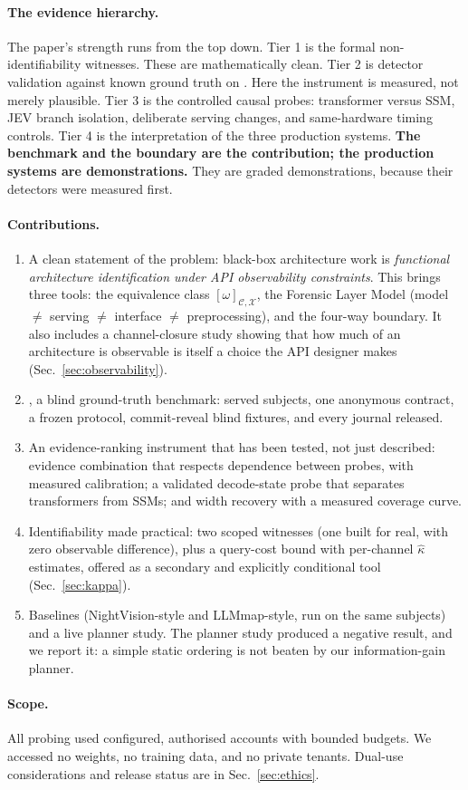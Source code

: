 \paragraph{The evidence hierarchy.}  The paper's strength runs from the top down.
Tier 1 is the formal non-identifiability witnesses.  These are mathematically clean.
Tier 2 is detector validation against known ground truth on \benchname{}.  Here the
instrument is measured, not merely plausible.  Tier 3 is the controlled causal probes:
transformer versus SSM, JEV branch isolation, deliberate serving changes, and
same-hardware timing controls.  Tier 4 is the interpretation of the three production
systems.  \textbf{The benchmark and the boundary are the contribution; the production
systems are demonstrations.}  They are graded demonstrations, because their detectors
were measured first.

\paragraph{Contributions.}
\begin{enumerate}[label=\textbf{C\arabic*.},leftmargin=2.6em]
\item A clean statement of the problem: black-box architecture work is \emph{functional
  architecture identification under API observability constraints}.  This brings
  three tools: the equivalence class $[\omega]_{\mathcal C,\mathcal X}$, the Forensic
  Layer Model (model $\neq$ serving $\neq$ interface $\neq$ preprocessing), and the
  four-way boundary.  It also includes a channel-closure study showing that how much of
  an architecture is observable is itself a choice the API designer makes
  (Sec.~\ref{sec:observability}).
\item \benchname{}, a blind ground-truth benchmark: \BenchN{} served subjects, one
  anonymous contract, a frozen protocol, commit-reveal blind fixtures, and every journal
  released.
\item An evidence-ranking instrument that has been tested, not just described: evidence
  combination that respects dependence between probes, with measured calibration; a
  validated decode-state probe that separates transformers from SSMs; and width recovery
  with a measured coverage curve.
\item Identifiability made practical: two scoped witnesses (one built for real, with zero
  observable difference), plus a query-cost bound with per-channel $\hat\kappa$
  estimates, offered as a secondary and explicitly conditional tool
  (Sec.~\ref{sec:kappa}).
\item Baselines (NightVision-style and LLMmap-style, run on the same subjects) and a live
  planner study.  The planner study produced a negative result, and we report it: a
  simple static ordering is not beaten by our information-gain planner.
\end{enumerate}

\paragraph{Scope.} All probing used configured, authorised accounts with bounded
budgets.  We accessed no weights, no training data, and no private tenants.  Dual-use
considerations and release status are in Sec.~\ref{sec:ethics}.
